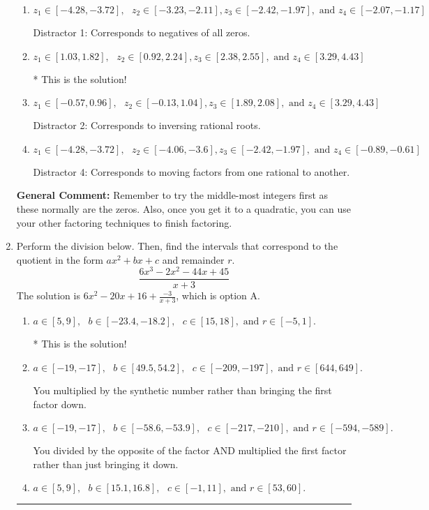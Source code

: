 \documentclass{extbook}[14pt]
\newcommand{\litem}[1]{\item #1

\rule{\textwidth}{0.4pt}}
\begin{document}
\begin{enumerate}
{\begin{enumerate}[label=\Alph*.]
 Distractor 3: Corresponds to negatives of all zeros AND inversing rational roots.
\item \( z_1 \in [-4.28, -3.72], \text{   }  z_2 \in [-3.23, -2.11], z_3 \in [-2.42, -1.97], \text{   and   } z_4 \in [-2.07, -1.17] \)

 Distractor 1: Corresponds to negatives of all zeros.
\item \( z_1 \in [1.03, 1.82], \text{   }  z_2 \in [0.92, 2.24], z_3 \in [2.38, 2.55], \text{   and   } z_4 \in [3.29, 4.43] \)

* This is the solution!
\item \( z_1 \in [-0.57, 0.96], \text{   }  z_2 \in [-0.13, 1.04], z_3 \in [1.89, 2.08], \text{   and   } z_4 \in [3.29, 4.43] \)

 Distractor 2: Corresponds to inversing rational roots.
\item \( z_1 \in [-4.28, -3.72], \text{   }  z_2 \in [-4.06, -3.6], z_3 \in [-2.42, -1.97], \text{   and   } z_4 \in [-0.89, -0.61] \)

 Distractor 4: Corresponds to moving factors from one rational to another.
\end{enumerate}

\textbf{General Comment:} Remember to try the middle-most integers first as these normally are the zeros. Also, once you get it to a quadratic, you can use your other factoring techniques to finish factoring.
}
\litem{
Perform the division below. Then, find the intervals that correspond to the quotient in the form $ax^2+bx+c$ and remainder $r$.
\[ \frac{6x^{3} -2 x^{2} -44 x + 45}{x + 3} \]The solution is \( 6x^{2} -20 x + 16 + \frac{-3}{x + 3} \), which is option A.\begin{enumerate}[label=\Alph*.]
\item \( a \in [5, 9], \text{   } b \in [-23.4, -18.2], \text{   } c \in [15, 18], \text{   and   } r \in [-5, 1]. \)

* This is the solution!
\item \( a \in [-19, -17], \text{   } b \in [49.5, 54.2], \text{   } c \in [-209, -197], \text{   and   } r \in [644, 649]. \)

 You multiplied by the synthetic number rather than bringing the first factor down.
\item \( a \in [-19, -17], \text{   } b \in [-58.6, -53.9], \text{   } c \in [-217, -210], \text{   and   } r \in [-594, -589]. \)

 You divided by the opposite of the factor AND multiplied the first factor rather than just bringing it down.
\item \( a \in [5, 9], \text{   } b \in [15.1, 16.8], \text{   } c \in [-1, 11], \text{   and   } r \in [53, 60]. \)


\end{enumerate}}
\end{enumerate}
\end{document}
